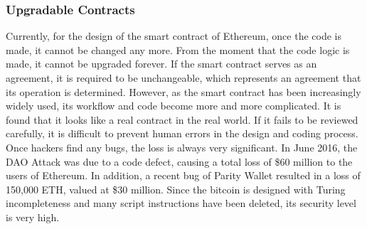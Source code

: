 
\subsubsection{Upgradable Contracts}

Currently, for the design of the smart contract of Ethereum, once the code is made, it cannot be changed any more. From the moment that the code logic is made, it cannot be upgraded forever. If the smart contract serves as an agreement, it is required to be unchangeable, which represents an agreement that its operation is determined. However, as the smart contract has been increasingly widely used, its workflow and code become more and more complicated. It is found that it looks like a real contract in the real world. If it fails to be reviewed carefully, it is difficult to prevent human errors in the design and coding process. Once hackers find any bugs, the loss is always very significant. In June 2016, the DAO Attack was due to a code defect, causing a total loss of \$60 million to the users of Ethereum. In addition, a recent bug of Parity Wallet resulted in a loss of 150,000 ETH, valued at \$30 million. Since the bitcoin is designed with Turing incompleteness and many script instructions have been deleted, its security level is very high. 


